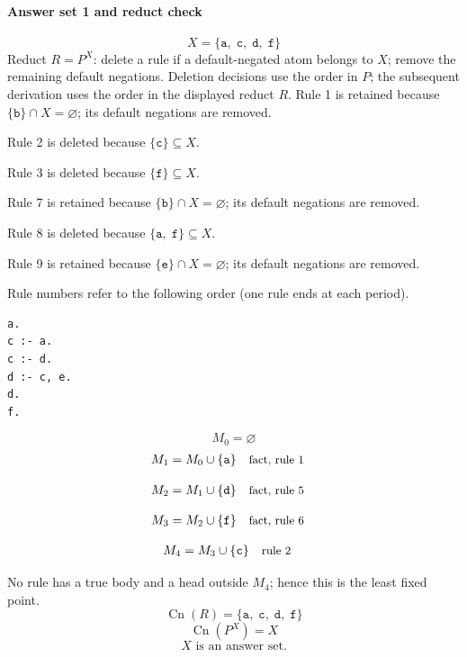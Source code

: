 \documentclass[a4paper,11pt]{article}
\newif\ifexplain
\newcommand{\explain}[1]{\ifexplain\begin{erklbox}#1\end{erklbox}\fi}
\newcommand{\why}[1]{\text{\small #1}}
\newcommand{\at}[1]{\texttt{#1}}
\begin{document}
\paragraph{Answer set 1 and reduct check}
\[
X=\{\at{a},\;\at{c},\;\at{d},\;\at{f}\}
\]
Reduct $R=P^X$: delete a rule if a default-negated atom belongs to $X$; remove the remaining default negations. Deletion decisions use the order in $P$; the subsequent derivation uses the order in the displayed reduct $R$.
Rule 1 is retained because $\{\at{b}\}\cap X=\varnothing$; its default negations are removed.

Rule 2 is deleted because $\{\at{c}\}\subseteq X$.

Rule 3 is deleted because $\{\at{f}\}\subseteq X$.

Rule 7 is retained because $\{\at{b}\}\cap X=\varnothing$; its default negations are removed.

Rule 8 is deleted because $\{\at{a},\;\at{f}\}\subseteq X$.

Rule 9 is retained because $\{\at{e}\}\cap X=\varnothing$; its default negations are removed.

Rule numbers refer to the following order (one rule ends at each period).
\begin{small}
\begin{verbatim}
a.
c :- a.
c :- d.
d :- c, e.
d.
f.
\end{verbatim}
\end{small}
\explain{Beim Redukt bleibt die Kandidatenmenge fest. Wir entscheiden zuerst, welche Regeln wegfallen. Erst danach berechnen wir aus den verbleibenden positiven Regeln die kleinste abgeschlossene Menge. Ein Modell allein reicht nicht: Diese Menge muss genau der Kandidat sein.}
\[
M_0=\varnothing
\]
\begin{align*}
M_{1} &= M_{0}\cup \{\at{a}\} && \why{fact, rule 1}
\end{align*}
\explain{Diese Regel hat keinen Körper. Ihr Kopf $\at{a}$ ist damit ein Fakt und muss in die Menge.}
\begin{align*}
M_{2} &= M_{1}\cup \{\at{d}\} && \why{fact, rule 5}
\end{align*}
\explain{Diese Regel hat keinen Körper. Ihr Kopf $\at{d}$ ist damit ein Fakt und muss in die Menge.}
\begin{align*}
M_{3} &= M_{2}\cup \{\at{f}\} && \why{fact, rule 6}
\end{align*}
\explain{Diese Regel hat keinen Körper. Ihr Kopf $\at{f}$ ist damit ein Fakt und muss in die Menge.}
\begin{align*}
M_{4} &= M_{3}\cup \{\at{c}\} && \why{rule 2}
\end{align*}
\explain{Für $\at{c}$ brauchen wir $\at{a}$. Weil diese Voraussetzungen bereits hergeleitet sind, dürfen wir den Regelkopf jetzt aufnehmen und alle bisherigen Atome behalten; bei einer fehlenden Voraussetzung würde diese Regel dagegen noch nichts beitragen.}
No rule has a true body and a head outside $M_{4}$; hence this is the least fixed point.
\[
\operatorname{Cn}(R)=\{\at{a},\;\at{c},\;\at{d},\;\at{f}\}
\]
\[
\operatorname{Cn}(P^X)=X
\]
\[
\boxed{X\text{ is an answer set.}}
\]
\end{document}
